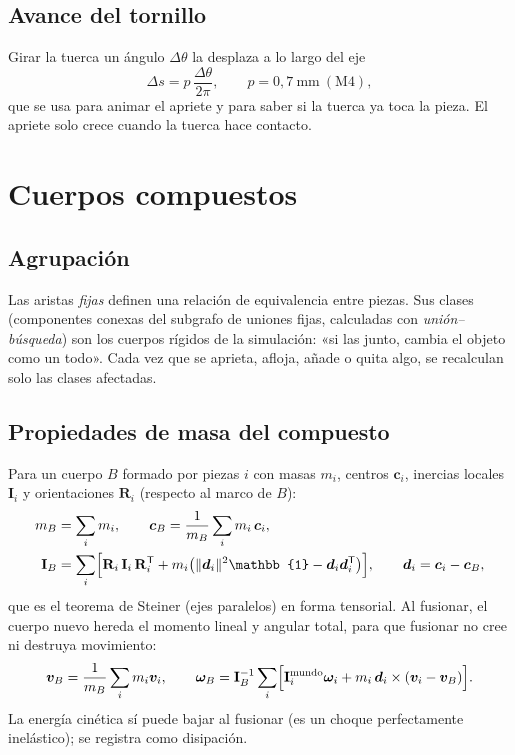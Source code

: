 \documentclass[11pt,a4paper]{article}
\numberwithin{equation}{section}
\newcommand{\vect}[1]{\bm{#1}}
\newcommand{\R}{\mathbf{R}}
\newcommand{\I}{\mathbf{I}}
\newcommand{\E}{\mathbb{1}}
\begin{document}
\subsection{Avance del tornillo}
Girar la tuerca un ángulo $\Delta\theta$ la desplaza a lo largo del eje
\begin{equation}
  \Delta s = p\,\frac{\Delta\theta}{2\pi}, \qquad p = 0{,}7\ \mathrm{mm}\ (\mathrm{M4}),
\end{equation}
que se usa para animar el apriete y para saber si la tuerca ya toca la pieza. El apriete solo crece cuando la tuerca
hace contacto.

\section{Cuerpos compuestos}

\subsection{Agrupación}
Las aristas \emph{fijas} definen una relación de equivalencia entre piezas. Sus clases (componentes conexas del
subgrafo de uniones fijas, calculadas con \emph{unión–búsqueda}) son los cuerpos rígidos de la simulación: «si las
junto, cambia el objeto como un todo». Cada vez que se aprieta, afloja, añade o quita algo, se recalculan solo las
clases afectadas.

\subsection{Propiedades de masa del compuesto}
Para un cuerpo $B$ formado por piezas $i$ con masas $m_i$, centros $\vect{c}_i$, inercias locales $\I_i$ y
orientaciones $\R_i$ (respecto al marco de $B$):
\begin{align}
  m_B &= \sum_i m_i, \qquad \vect{c}_B = \frac{1}{m_B}\sum_i m_i\,\vect{c}_i,\\
  \I_B &= \sum_i \Bigl[\R_i\,\I_i\,\R_i^{\mathsf T} + m_i\bigl(\lVert\vect{d}_i\rVert^2\E - \vect{d}_i\vect{d}_i^{\mathsf T}\bigr)\Bigr],
  \qquad \vect{d}_i = \vect{c}_i - \vect{c}_B,
\end{align}
que es el teorema de Steiner (ejes paralelos) en forma tensorial. Al fusionar, el cuerpo nuevo hereda el momento
lineal y angular total, para que fusionar no cree ni destruya movimiento:
\begin{equation}
  \vect{v}_B = \frac{1}{m_B}\sum_i m_i\vect{v}_i, \qquad
  \vect{\omega}_B = \I_B^{-1}\sum_i\Bigl[\I_i^{\text{mundo}}\vect{\omega}_i + m_i\,\vect{d}_i\times(\vect{v}_i - \vect{v}_B)\Bigr].
\end{equation}
La energía cinética sí puede bajar al fusionar (es un choque perfectamente inelástico); se registra como disipación.
\end{document}
